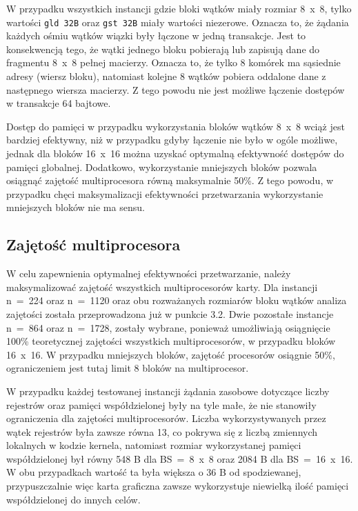 \documentclass[12pt,a4paper]{article}
\begin{document}
W przypadku wszystkich instancji gdzie bloki wątków miały rozmiar 8~x~8, tylko wartości \verb|gld 32B| oraz \verb|gst 32B| miały wartości niezerowe. Oznacza to, że żądania każdych ośmiu wątków wiązki były łączone w jedną transakcje. Jest to konsekwencją tego, że wątki jednego bloku pobierają lub zapisują dane do fragmentu 8~x~8 pełnej macierzy. Oznacza to, że tylko 8 komórek ma sąsiednie adresy (wiersz bloku), natomiast kolejne 8 wątków pobiera oddalone dane z następnego wiersza macierzy. Z tego powodu nie jest możliwe łączenie dostępów w transakcje 64 bajtowe.

Dostęp do pamięci w przypadku wykorzystania bloków wątków 8~x~8 wciąż jest bardziej efektywny, niż w przypadku gdyby łączenie nie było w ogóle możliwe, jednak dla bloków 16~x~16 można uzyskać optymalną efektywność dostępów do pamięci globalnej. Dodatkowo, wykorzystanie mniejszych bloków pozwala osiągnąć zajętość multiprocesora równą maksymalnie 50\%. Z tego powodu, w przypadku chęci maksymalizacji efektywności przetwarzania wykorzystanie mniejszych bloków nie ma sensu.

\subsection{Zajętość multiprocesora}

W celu zapewnienia optymalnej efektywności przetwarzanie, należy maksymalizować zajętość wszystkich multiprocesorów karty. Dla instancji n~=~224 oraz n~=~1120 oraz obu rozważanych rozmiarów bloku wątków analiza zajętości została przeprowadzona już w punkcie 3.2. Dwie pozostałe instancje n~=~864 oraz n~=~1728, zostały wybrane, ponieważ umożliwiają osiągnięcie  100\% teoretycznej zajętości wszystkich multiprocesorów, w przypadku bloków 16~x~16. W przypadku mniejszych bloków, zajętość procesorów osiągnie 50\%, ograniczeniem jest tutaj limit 8 bloków na multiprocesor.

W przypadku każdej testowanej instancji żądania zasobowe dotyczące liczby rejestrów oraz pamięci współdzielonej były na tyle małe, że nie stanowiły ograniczenia dla zajętości multiprocesorów. Liczba wykorzystywanych przez wątek rejestrów była zawsze równa 13, co pokrywa się z liczbą zmiennych lokalnych w kodzie kernela, natomiast rozmiar wykorzystanej pamięci współdzielonej był równy 548 B dla BS~=~8~x~8 oraz 2084 B dla BS~=~16~x~16. W obu przypadkach wartość ta była większa o 36 B od spodziewanej, przypuszczalnie więc karta graficzna zawsze wykorzystuje niewielką ilość pamięci współdzielonej do innych celów.
\end{document}
